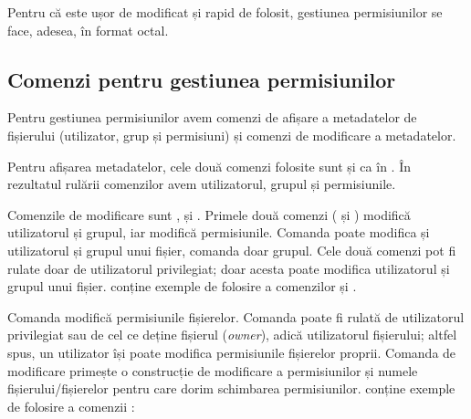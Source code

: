 Pentru că este ușor de modificat și rapid de folosit, gestiunea permisiunilor
se face, adesea, în format octal.

\subsection{Comenzi pentru gestiunea permisiunilor}
\label{sec:user:perm-cmd}

Pentru gestiunea permisiunilor avem comenzi de afișare a metadatelor de
fișierului (utilizator, grup și permisiuni) și comenzi de modificare a
metadatelor.

Pentru afișarea metadatelor, cele două comenzi folosite sunt  și 
ca în . În rezultatul rulării comenzilor avem utilizatorul, grupul și permisiunile.

Comenzile de modificare sunt ,  și . Primele două comenzi (
și ) modifică utilizatorul și grupul, iar  modifică permisiunile. Comanda
 poate modifica și utilizatorul și grupul unui fișier, comanda  doar
grupul. Cele două comenzi pot fi rulate doar de utilizatorul privilegiat; doar
acesta poate modifica utilizatorul și grupul unui fișier.  conține exemple
de folosire a comenzilor  și .


Comanda  modifică permisiunile fișierelor. Comanda poate fi rulată de
utilizatorul privilegiat sau de cel ce deține fișierul (\textit{owner}), adică
utilizatorul fișierului; altfel spus, un utilizator își poate modifica
permisiunile fișierelor proprii. Comanda de modificare primește o construcție de
modificare a permisiunilor și numele fișierului/fișierelor pentru care dorim
schimbarea permisiunilor.  conține exemple
de folosire a comenzii :

